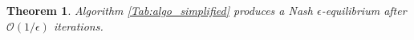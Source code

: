 \documentclass{article} %
\newtheorem{theorem}{Theorem} \newtheorem{lemma}[theorem]{Lemma}
\begin{document}
\begin{algorithm}[G_2]
  \label{Tab:algo_simplified}
\end{algorithm}

\begin{theorem}
  \label{thm:conv}
  Algorithm \ref{Tab:algo_simplified} produces a Nash $\epsilon$-equilibrium after $\mathcal{O}(1/\epsilon)$ iterations.
\end{theorem}
\end{document}
